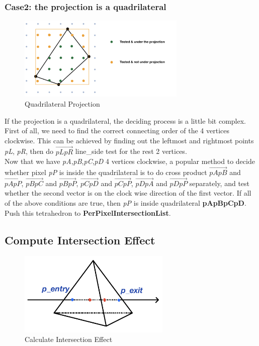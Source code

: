 \documentclass[acmtog]{acmart}
\begin{document}
\subsubsection{Case2: the projection is a quadrilateral}
\begin{figure}[h]
\centering
\includegraphics[height=4cm]{figure/quadri}
\caption{Quadrilateral Projection}
\end{figure}
If the projection is a quadrilateral, the deciding process is a little bit complex. First of all, we need to find the correct connecting order of the 4 vertices clockwise. This can be achieved by finding out the leftmost and rightmost points \emph{pL}, \emph{pR}, then do $\overrightarrow{pLpR}$ line\_side test for the rest 2 vertices.
\\Now that we have \emph{pA},\emph{pB},\emph{pC},\emph{pD} 4 vertices clockwise, a popular method to decide whether pixel \emph{pP} is inside the quadrilateral is to do cross product $\overrightarrow{pApB}$ and $\overrightarrow{pApP}$, $\overrightarrow{pBpC}$ and $\overrightarrow{pBpP}$, $\overrightarrow{pCpD}$ and $\overrightarrow{pCpP}$, $\overrightarrow{pDpA}$ and $\overrightarrow{pDpP}$ separately, and test whether the second vector is on the clock wise direction of the first vector. If all of the above conditions are true, then \emph{pP} is inside quadrilateral \textbf{pApBpCpD}. Push this tetrahedron to \textbf{PerPixelIntersectionList}.

\subsection{Compute Intersection Effect}
\begin{figure}[h]
\centering
\includegraphics[height=4cm]{figure/NBCIE}
\caption{Calculate Intersection Effect}
\end{figure}
\end{document}
